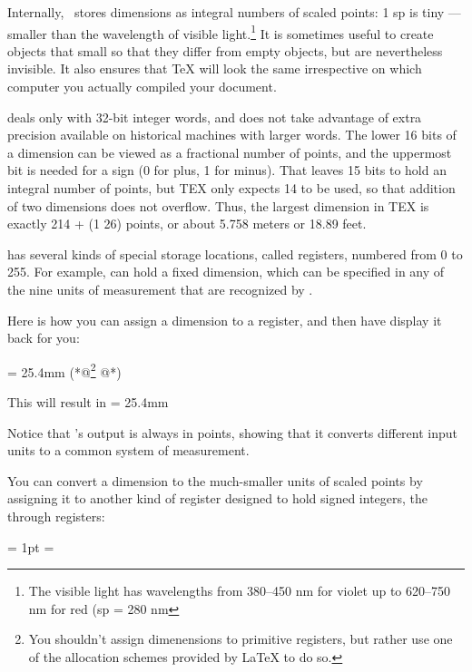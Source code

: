 Internally, \tex\ stores dimensions as integral numbers of scaled points:
1 sp is tiny ---  smaller than the wavelength of visible light.\footnote{The visible light has wavelengths from 380--450 nm for violet up to 620--750 nm for red (sp = 280 nm} It is sometimes
useful to create objects that small so that they differ from empty objects,
but are nevertheless invisible. It also ensures that TeX will look the same irrespective on which computer you actually compiled your document.

\tex deals only with 32-bit integer words, and does not take advantage
of extra precision available on historical machines with larger words. The
lower 16 bits of a dimension can be viewed as a fractional number of points,
and the uppermost bit is needed for a sign (0 for plus, 1 for minus). That
leaves 15 bits to hold an integral number of points, but TEX only expects 14
to be used, so that addition of two dimensions does not overflow. Thus, the
largest dimension in TEX is exactly 214 + (1 26) points, or about 5.758  
meters or 18.89 feet.

\tex has several kinds of special storage locations, called registers, numbered
from 0 to 255. For example, can hold a fixed dimension,
which can be specified in any of the nine units of measurement that are
recognized by \tex.

Here is how you can assign a dimension to a register, and then have \tex
display it back for you:

\begin{teXXX}
 = 25.4mm (*@\protect\footnote{You shouldn't assign dimenensions to primitive registers, but rather use one of the allocation schemes provided by LaTeX to do so.}  @*)
\the{}
\end{teXXX}

This will result in
 = 25.4mm

\the{}


Notice that \tex’s output is always in points, showing that it converts different
input units to a common system of measurement.

You can convert a dimension to the much-smaller units of scaled points
by assigning it to another kind of \tex register designed to hold signed integers,
the through registers:

\begin{texexample}{}{}
\bgroup
   = 1pt
   = 
  \the{}
\egroup
\end{texexample}

